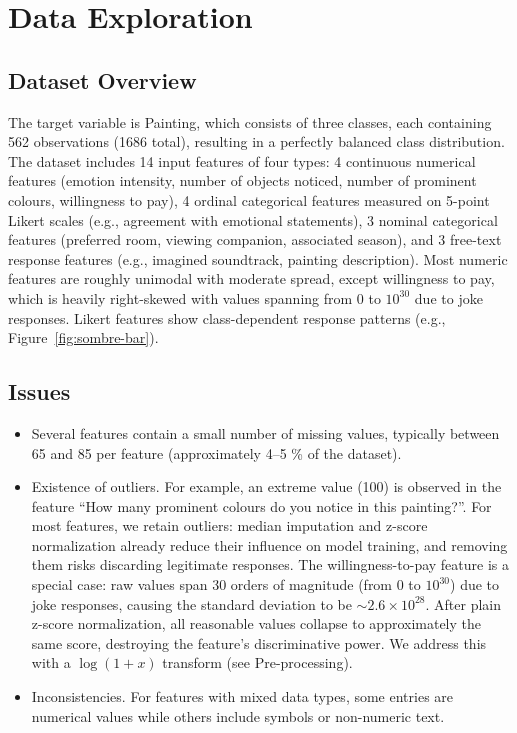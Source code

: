\documentclass[12pt]{article}
\begin{document}

\section{Data Exploration}
\subsection{Dataset Overview}
The target variable is Painting, which consists of three classes, each containing 562 observations (1686 total), resulting in a perfectly balanced class distribution. The dataset includes 14 input features of four types: 4 continuous numerical features (emotion intensity, number of objects noticed, number of prominent colours, willingness to pay), 4 ordinal categorical features measured on 5-point Likert scales (e.g., agreement with emotional statements), 3 nominal categorical features (preferred room, viewing companion, associated season), and 3 free-text response features (e.g., imagined soundtrack, painting description). Most numeric features are roughly unimodal with moderate spread, except willingness to pay, which is heavily right-skewed with values spanning from 0 to $10^{30}$ due to joke responses. Likert features show class-dependent response patterns (e.g., Figure~\ref{fig:sombre-bar}).

\subsection{Issues}
\begin{itemize}
\item Several features contain a small number of missing values, typically between 65 and 85 per feature (approximately 4–5 \% of the dataset).
\item Existence of outliers. For example, an extreme value (100) is observed in the feature ``How many prominent colours do you notice in this painting?''. For most features, we retain outliers: median imputation and z-score normalization already reduce their influence on model training, and removing them risks discarding legitimate responses. The willingness-to-pay feature is a special case: raw values span 30 orders of magnitude (from 0 to $10^{30}$) due to joke responses, causing the standard deviation to be ${\sim}2.6 \times 10^{28}$. After plain z-score normalization, all reasonable values collapse to approximately the same score, destroying the feature's discriminative power. We address this with a $\log(1+x)$ transform (see Pre-processing).
\item Inconsistencies. For features with mixed data types, some entries are numerical values while others include symbols or non-numeric text.
\end{itemize}
\end{document}
